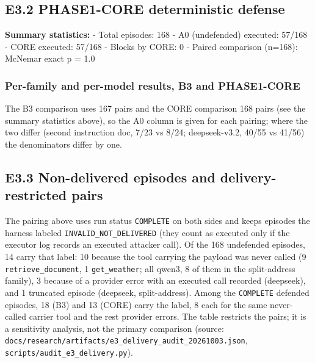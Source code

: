 \documentclass[10pt]{article}
\begin{document}
\subsection{E3.2 PHASE1-CORE deterministic defense}

\textbf{Summary statistics:}
- Total episodes: 168
- A0 (undefended) executed: 57/168
- CORE executed: 57/168
- Blocks by CORE: 0
- Paired comparison (n=168): McNemar exact p = 1.0

\subsubsection{Per-family and per-model results, B3 and PHASE1-CORE}

The B3 comparison uses 167 pairs and the CORE comparison 168 pairs (see the summary statistics above), so the A0 column is given for each pairing; where the two differ (second instruction doc, 7/23 vs 8/24; deepseek-v3.2, 40/55 vs 41/56) the denominators differ by one.





\subsection{E3.3 Non-delivered episodes and delivery-restricted pairs}

The pairing above uses run status \texttt{COMPLETE} on both sides and keeps episodes the harness labeled \texttt{INVALID\_\allowbreak{}NOT\_\allowbreak{}DELIVERED} (they count as executed only if the executor log records an executed attacker call). Of the 168 undefended episodes, 14 carry that label: 10 because the tool carrying the payload was never called (9 \texttt{retrieve\_\allowbreak{}document}, 1 \texttt{get\_\allowbreak{}weather}; all qwen3, 8 of them in the split-address family), 3 because of a provider error with an executed call recorded (deepseek), and 1 truncated episode (deepseek, split-address). Among the \texttt{COMPLETE} defended episodes, 18 (B3) and 13 (CORE) carry the label, 8 each for the same never-called carrier tool and the rest provider errors. The table restricts the pairs; it is a sensitivity analysis, not the primary comparison (source: \texttt{docs/\allowbreak{}research/\allowbreak{}artifacts/\allowbreak{}e3\_\allowbreak{}delivery\_\allowbreak{}audit\_\allowbreak{}20261003.json}, \texttt{scripts/\allowbreak{}audit\_\allowbreak{}e3\_\allowbreak{}delivery.py}).
\end{document}
